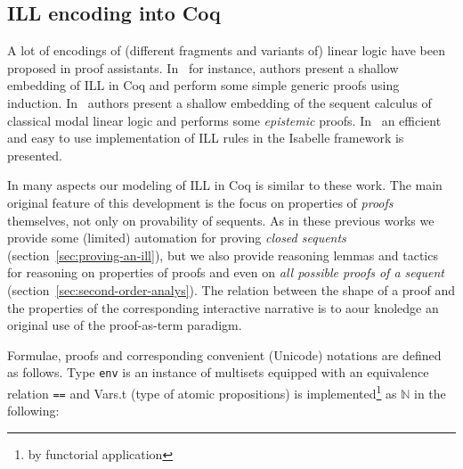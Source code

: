 \documentclass[runningheads,a4paper]{llncs}
\newcommand{\N}{\mathbb{N}}
\begin{document}
\subsection{ILL encoding into Coq}
\label{sec:ill-encoding-into}

A lot of encodings of (different fragments and variants of) linear
logic have been proposed in proof assistants. In~\cite{Power99} for
instance, authors present a shallow embedding of ILL in Coq and
perform some simple generic proofs using induction.
In~\cite{Sadrzadeh03modallinear} authors present a shallow embedding
of the sequent calculus of classical modal linear logic and performs
some \emph{epistemic} proofs. In~\cite{Kalvala95mechanizinglinear} an
efficient and easy to use implementation of ILL rules in the Isabelle
framework is presented.

In many aspects our modeling of ILL in Coq is similar to these work.
The main original feature of this development is the focus on
properties of \emph{proofs} themselves, not only on provability of
sequents. As in these previous works we provide some (limited)
automation for proving \emph{closed sequents}
(section~\ref{sec:proving-an-ill}), but we also provide reasoning
lemmas and tactics for reasoning on properties of proofs and even on
\emph{all possible proofs of a sequent}
(section~\ref{sec:second-order-analys}). The relation between the
shape of a proof and the properties of the corresponding interactive
narrative is to aour knoledge an original use of the proof-as-term
paradigm.


Formulae, proofs and corresponding convenient (Unicode) notations are
defined as follows. Type \texttt{env} is an instance of multisets
equipped with an equivalence relation \texttt{==} and Vars.t (type of
atomic propositions) is implemented\footnote{by functorial
  application} as $\N$ in the following:
\end{document}
